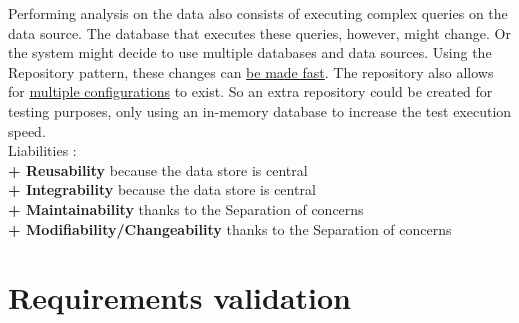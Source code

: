 Performing analysis on the data also consists of executing complex queries on the data source. The database that executes these queries, however, might change. Or the system might decide to use multiple databases and data sources.
Using the Repository pattern, these changes can \underline{be made fast}. The repository also allows for \underline{multiple configurations} to exist. So an extra repository could be created for testing purposes, only using an in-memory database to increase the test execution speed. \\

\textit{} Liabilities : \\
\textbf{+ Reusability} because the data store is central \\
\textbf{+ Integrability} because the data store is central \\
\textbf{+ Maintainability} thanks to the Separation of concerns \\
\textbf{+ Modifiability/Changeability} thanks to the Separation of concerns\\


\section{Requirements validation}
\label{sec:req-validation}



